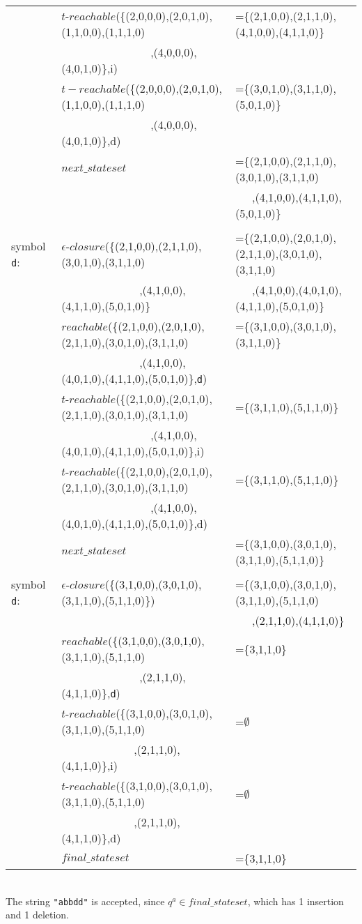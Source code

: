 \begin{myex}
\begin{table}[h!]
\begin{tabular}{l l l}
&$t$-$reachable$(\{(2,0,0,0),(2,0,1,0),(1,1,0,0),(1,1,1,0)&=\{(2,1,0,0),(2,1,1,0),(4,1,0,0),(4,1,1,0)\}\\
&~~~~~~~~~~~~~~~~,(4,0,0,0),(4,0,1,0)\},i)\\

&$t-reachable$(\{(2,0,0,0),(2,0,1,0),(1,1,0,0),(1,1,1,0)&=\{(3,0,1,0),(3,1,1,0),(5,0,1,0)\}\\
&~~~~~~~~~~~~~~~~,(4,0,0,0),(4,0,1,0)\},d)\\

&$next\_stateset$&=\{(2,1,0,0),(2,1,1,0),(3,0,1,0),(3,1,1,0)\\
&&~~~,(4,1,0,0),(4,1,1,0),(5,0,1,0)\}\\
\\
symbol {\tt d}:&$\epsilon$-$closure$(\{(2,1,0,0),(2,1,1,0),(3,0,1,0),(3,1,1,0)&=\{(2,1,0,0),(2,0,1,0),(2,1,1,0),(3,0,1,0),(3,1,1,0)\\
&~~~~~~~~~~~~~~,(4,1,0,0),(4,1,1,0),(5,0,1,0)\}&~~~,(4,1,0,0),(4,0,1,0),(4,1,1,0),(5,0,1,0)\}\\
&$reachable$(\{(2,1,0,0),(2,0,1,0),(2,1,1,0),(3,0,1,0),(3,1,1,0)&=\{(3,1,0,0),(3,0,1,0),(3,1,1,0)\}\\
&~~~~~~~~~~~~~~,(4,1,0,0),(4,0,1,0),(4,1,1,0),(5,0,1,0)\},{\tt d})\\

&$t$-$reachable$(\{(2,1,0,0),(2,0,1,0),(2,1,1,0),(3,0,1,0),(3,1,1,0)&=\{(3,1,1,0),(5,1,1,0)\}\\
&~~~~~~~~~~~~~~~~,(4,1,0,0),(4,0,1,0),(4,1,1,0),(5,0,1,0)\},i)\\

&$t$-$reachable$(\{(2,1,0,0),(2,0,1,0),(2,1,1,0),(3,0,1,0),(3,1,1,0)&=\{(3,1,1,0),(5,1,1,0)\}\\
&~~~~~~~~~~~~~~~~,(4,1,0,0),(4,0,1,0),(4,1,1,0),(5,0,1,0)\},d)\\
&$next\_stateset$&=\{(3,1,0,0),(3,0,1,0),(3,1,1,0),(5,1,1,0)\}\\
\\
symbol {\tt d}:&$\epsilon$-$closure$(\{(3,1,0,0),(3,0,1,0),(3,1,1,0),(5,1,1,0)\})&=\{(3,1,0,0),(3,0,1,0),(3,1,1,0),(5,1,1,0)\\
&&~~~,(2,1,1,0),(4,1,1,0)\}\\
&$reachable$(\{(3,1,0,0),(3,0,1,0),(3,1,1,0),(5,1,1,0)&=\{3,1,1,0\}\\
&~~~~~~~~~~~~~~,(2,1,1,0),(4,1,1,0)\},{\tt d})\\
&$t$-$reachable$(\{(3,1,0,0),(3,0,1,0),(3,1,1,0),(5,1,1,0)&=$\emptyset$\\
&~~~~~~~~~~~~~,(2,1,1,0),(4,1,1,0)\},i)\\
&$t$-$reachable$(\{(3,1,0,0),(3,0,1,0),(3,1,1,0),(5,1,1,0)&=$\emptyset$\\
&~~~~~~~~~~~~~,(2,1,1,0),(4,1,1,0)\},d)\\
&$final\_stateset$&=\{3,1,1,0\}
\end{tabular}
\end{table}\\
The string {\tt "abbdd"} is accepted, since $q^a\in final\_stateset$, which has 1 insertion and 1 deletion.
\end{myex}